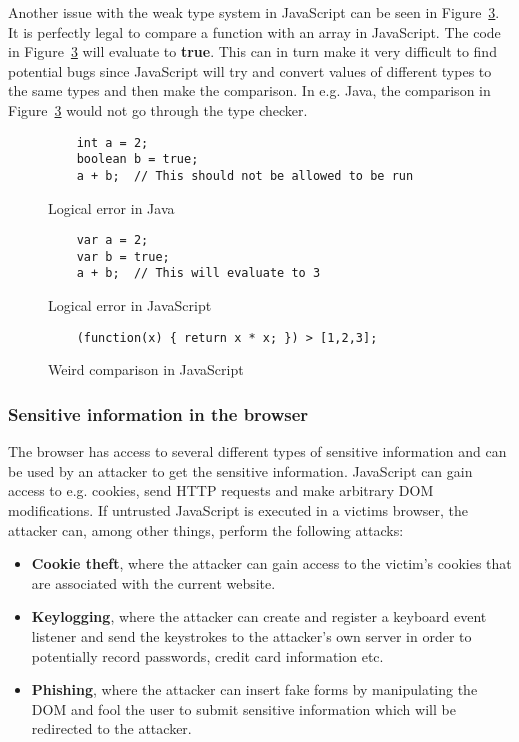 Another issue with the weak type system in JavaScript can be seen in Figure~\ref{fig:js_comparison}. It is perfectly legal to compare a function with an array in JavaScript. The code in Figure~\ref{fig:js_comparison} will evaluate to \textbf{true}. This can in turn make it very difficult to find potential bugs since JavaScript will try and convert values of different types to the same types and then make the comparison. In e.g. Java, the comparison in Figure~\ref{fig:js_comparison} would not go through the type checker.
\begin{figure}[h]
  \lstset{language=Java}
  \begin{lstlisting}
    int a = 2;
    boolean b = true;
    a + b;  // This should not be allowed to be run
  \end{lstlisting}
  \caption{Logical error in Java}
  \label{fig:error_java}
\end{figure}
\begin{figure}[h]
  \begin{lstlisting}
    var a = 2;
    var b = true;
    a + b;  // This will evaluate to 3
  \end{lstlisting}
  \caption{Logical error in JavaScript}
  \label{fig:error_js}
\end{figure}
\begin{figure}[h]
  \begin{lstlisting}
    (function(x) { return x * x; }) > [1,2,3];
  \end{lstlisting}
  \caption{Weird comparison in JavaScript}
  \label{fig:js_comparison}
\end{figure}

\subsubsection{Sensitive information in the browser}
The browser has access to several different types of sensitive information and can be used by an attacker to get the sensitive information. JavaScript can gain access to e.g. cookies, send HTTP requests and make arbitrary DOM modifications. If untrusted JavaScript is executed in a victims browser, the attacker can, among other things, perform the following attacks:
\begin{itemize}
  \item \textbf{Cookie theft}, where the attacker can gain access to the victim's cookies that are associated with the current website.
  \item \textbf{Keylogging}, where the attacker can create and register a keyboard event listener and send the keystrokes to the attacker's own server in order to potentially record passwords, credit card information etc.
  \item \textbf{Phishing}, where the attacker can insert fake forms by manipulating the DOM and fool the user to submit sensitive information which will be redirected to the attacker.
\end{itemize}
